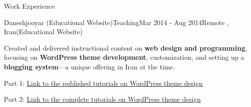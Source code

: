 \documentclass[]{kyvernitis-resume}
\begin{document}
\begin{section}{Work Experience}
 \begin{subsection}{Daneshjooyar (Educational Website)}{Teaching}{Mar 2014 - Aug 2014}{Remote , Iran}{(Educational Website)}
	\item Created and delivered instructional content on \textbf{web design and programming}, focusing on \textbf{WordPress theme development}, customization, and setting up a \textbf{blogging system}—a unique offering in Iran at the time.
	\item Part 1:  \href{https://www.daneshjooyar.com/%d9%82%d8%b3%d9%85%d8%aa-%d9%86%d9%87%d8%a7%db%8c%db%8c-%d8%b3%d8%b1%db%8c-%d8%a2%d9%85%d9%88%d8%b2%d8%b4%db%8c-%d8%b7%d8%b1%d8%a7%d8%ad%db%8c-%d9%82%d8%a7%d9%84%d8%a8-%d9%88%d8%b1%d8%af%d9%be%d8%b1/}{Link to the published tutorials on WordPress theme design} 
	\item Part 2: \href{https://www.daneshjooyar.com/%d8%a2%d9%85%d9%88%d8%b2%d8%b4-%d8%b7%d8%b1%d8%a7%d8%ad%db%8c-%d9%82%d8%a7%d9%84%d8%a8-%d9%88%d8%b1%d8%af%d9%be%d8%b1%d8%b3-%d8%aa%d9%85%d8%a7%d9%85%db%8c-%d9%82%d8%b3%d9%85%d8%aa-%d9%87%d8%a7-%d9%82/}{Link to the complete tutorials on WordPress theme design}
    \end{subsection}
    
\end{section}
\end{document}
